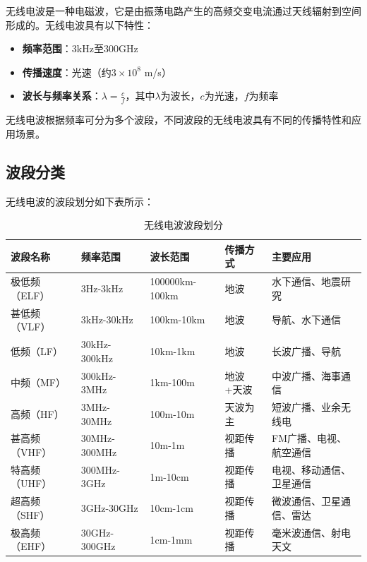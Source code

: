 无线电波是一种电磁波，它是由振荡电路产生的高频交变电流通过天线辐射到空间形成的。无线电波具有以下特性：

\begin{itemize}
    \item \textbf{频率范围}：3kHz至300GHz
    \item \textbf{传播速度}：光速（约$3\times10^8$ m/s）
    \item \textbf{波长与频率关系}：$\lambda = \frac{c}{f}$，其中$\lambda$为波长，$c$为光速，$f$为频率
\end{itemize}

无线电波根据频率可分为多个波段，不同波段的无线电波具有不同的传播特性和应用场景。

\subsection{波段分类}
\label{sec:wave_bands}

无线电波的波段划分如下表所示：

\begin{table}[htbp]
    \centering
    \small
    \caption{无线电波波段划分}
    \begin{tabular}{|p{2cm}|p{2cm}|p{2cm}|p{1.5cm}|p{2.5cm}|}
        \hline
        \textbf{波段名称} & \textbf{频率范围} & \textbf{波长范围} & \textbf{传播方式} & \textbf{主要应用} \\
        \hline
        极低频（ELF） & 3Hz-3kHz & 100000km-100km & 地波 & 水下通信、地震研究 \\
        \hline
        甚低频（VLF） & 3kHz-30kHz & 100km-10km & 地波 & 导航、水下通信 \\
        \hline
        低频（LF） & 30kHz-300kHz & 10km-1km & 地波 & 长波广播、导航 \\
        \hline
        中频（MF） & 300kHz-3MHz & 1km-100m & 地波+天波 & 中波广播、海事通信 \\
        \hline
        高频（HF） & 3MHz-30MHz & 100m-10m & 天波为主 & 短波广播、业余无线电 \\
        \hline
        甚高频（VHF） & 30MHz-300MHz & 10m-1m & 视距传播 & FM广播、电视、航空通信 \\
        \hline
        特高频（UHF） & 300MHz-3GHz & 1m-10cm & 视距传播 & 电视、移动通信、卫星通信 \\
        \hline
        超高频（SHF） & 3GHz-30GHz & 10cm-1cm & 视距传播 & 微波通信、卫星通信、雷达 \\
        \hline
        极高频（EHF） & 30GHz-300GHz & 1cm-1mm & 视距传播 & 毫米波通信、射电天文 \\
        \hline
    \end{tabular}
\end{table}

